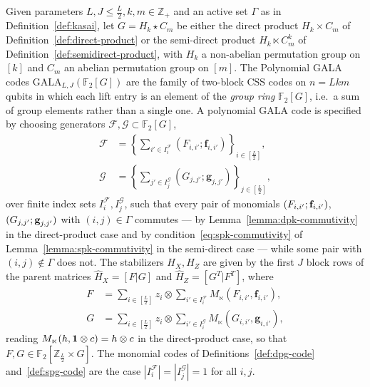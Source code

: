 \begin{definition}\label{def:pg-code}
Given parameters $L, J \leq \tfrac{L}{2}, k, m \in \mathbb{Z}_+$ and an active set $\Gamma$ as in Definition~\ref{def:kasai}, let $G = H_k\star C_m$ be either the direct product $H_k\times C_m$ of Definition~\ref{def:direct-product} or the semi-direct product $H_k\ltimes C^k_m$ of Definition~\ref{def:semidirect-product}, with $H_k$ a non-abelian permutation group on $[k]$ and $C_m$ an abelian permutation group on $[m]$. The Polynomial GALA codes $\mathrm{GALA}_{L,J}(\mathbb F_2[G])$ are the family of two-block CSS codes on $n = Lkm$ qubits in which each lift entry is an element of the \emph{group ring} $\mathbb F_2[G]$, i.e.\ a sum of group elements rather than a single one. A polynomial GALA code is specified by choosing generators $\mathcal F,\mathcal G\subset\mathbb F_2[G]$,
\begin{align*}
    \mathcal{F} &= \left\{\sum_{i'\in I^{\mathcal F}_i}(F_{i,i'}; \textbf{f}_{i,i'})\right\}_{i\in[\frac L2]},\\
    \mathcal{G} &= \left\{\sum_{j'\in I^{\mathcal G}_j}(G_{j,j'}; \textbf{g}_{j,j'})\right\}_{j\in[\frac L2]},
\end{align*}
over finite index sets $I^{\mathcal F}_i, I^{\mathcal G}_j$, such that every pair of monomials $(F_{i,i'};\textbf f_{i,i'})$, $(G_{j,j'};\textbf g_{j,j'})$ with $(i,j)\in\Gamma$ commutes --- by Lemma~\ref{lemma:dpk-commutivity} in the direct-product case and by condition~\eqref{eq:spk-commutivity} of Lemma~\ref{lemma:spk-commutivity} in the semi-direct case --- while some pair with $(i,j)\notin\Gamma$ does not. The stabilizers $ H_X, {H}_Z$ are given by the first $J$ block rows of the parent matrices $\hat H_X = [F|G]$ and $\hat H_Z = [G^T|F^T]$, where
\begin{align*}
    F &= \sum_{i\in [\frac{L}{2}]} z_i\otimes \sum_{i'\in I^{\mathcal F}_i}M_\ltimes(F_{i,i'}, \textbf{f}_{i,i'}) ,\\
    G &= \sum_{i\in [\frac{L}{2}]} z_i\otimes \sum_{i'\in I^{\mathcal G}_i}M_\ltimes(G_{i,i'},\textbf{g}_{i,i'}),
\end{align*}
reading $M_\ltimes(h,\textbf 1\otimes c) = h\otimes c$ in the direct-product case, so that $F,G\in\mathbb F_2[\mathbb Z_{\frac L2}\times G]$. The monomial codes of Definitions~\ref{def:dpg-code} and~\ref{def:spg-code} are the case $|I^{\mathcal F}_i| = |I^{\mathcal G}_j| = 1$ for all $i,j$.
\end{definition}

